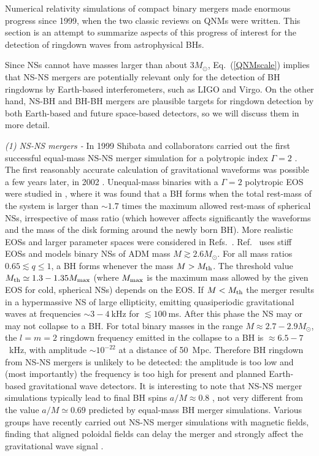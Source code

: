 \documentclass[]{iopart}
\begin{document}
Numerical relativity simulations of compact binary mergers made enormous
progress since 1999, when the two classic reviews on QNMs
\cite{Kokkotas:1999bd,Nollert:1999ji} were written. This section is an attempt
to summarize aspects of this progress of interest for the detection of
ringdown waves from astrophysical BHs.

Since NSs cannot have masses larger than about $3M_\odot$,
Eq.~(\ref{QNMscale}) implies that NS-NS mergers are potentially relevant only
for the detection of BH ringdowns by Earth-based interferometers, such as LIGO
and Virgo. On the other hand, NS-BH and BH-BH mergers are plausible targets
for ringdown detection by both Earth-based and future space-based detectors,
so we will discuss them in more detail.

\noindent
{\it (1) NS-NS mergers -} In 1999 Shibata and collaborators carried out the
first successful equal-mass NS-NS merger simulation for a polytropic index
$\Gamma=2$ \cite{Shibata:1999hn,Shibata:1999wm}.  The first reasonably
accurate calculation of gravitational waveforms was possible a few years
later, in 2002 \cite{Shibata:2002jb}. Unequal-mass binaries with a $\Gamma=2$
polytropic EOS were studied in \cite{Shibata:2003ga}, where it was found that
a BH forms when the total rest-mass of the system is larger than $\sim 1.7$
times the maximum allowed rest-mass of spherical NSs, irrespective of mass
ratio (which however affects significantly the waveforms and the mass of the
disk forming around the newly born BH).  More realistic EOSs and larger
parameter spaces were considered in Refs.~\cite{Shibata:2005ss,Shibata:2006nm}.
Ref.~\cite{Shibata:2006nm} uses stiff EOSs and models binary NSs of ADM mass
$M\gtrsim 2.6M_\odot$. For all mass ratios $0.65\lesssim q\leq 1$, a BH forms
whenever the mass $M>M_{\rm th}$. The threshold value $M_{\rm th}\simeq
1.3-1.35M_{\rm max}$ (where $M_{\rm max}$ is the maximum mass allowed by the
given EOS for cold, spherical NSs) depends on the EOS. If $M<M_{\rm th}$ the
merger results in a hypermassive NS of large ellipticity, emitting
quasiperiodic gravitational waves at frequencies $\sim 3-4~$kHz for $\lesssim
100~$ms. After this phase the NS may or may not collapse to a BH. For total
binary masses in the range $M\approx 2.7-2.9M_\odot$, the $l=m=2$ ringdown
frequency emitted in the collapse to a BH is $\approx 6.5-7$~kHz, with
amplitude $\sim 10^{-22}$ at a distance of 50~Mpc. Therefore BH ringdown from
NS-NS mergers is unlikely to be detected: the amplitude is too low and (most
importantly) the frequency is too high for present and planned Earth-based
gravitational wave detectors. It is interesting to note that NS-NS merger
simulations typically lead to final BH spins $a/M\approx 0.8$
\cite{Shibata:2006nm,Yamamoto:2008js}, not very different from the value
$a/M\simeq 0.69$ predicted by equal-mass BH merger simulations.  Various
groups have recently carried out NS-NS merger simulations with magnetic
fields, finding that aligned poloidal fields can delay the merger and strongly
affect the gravitational wave signal
\cite{Anderson:2008zp,Liu:2008xy,Baiotti:2009gk}.
\end{document}
